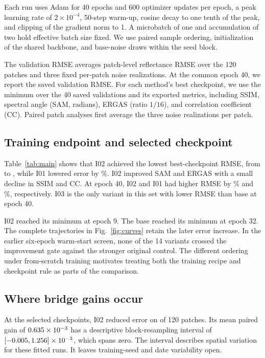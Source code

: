 \documentclass{article}
\begin{document}
Each run uses Adam for 40 epochs and 600 optimizer updates per epoch, a peak learning rate of $2\times10^{-4}$, 50-step warm-up, cosine decay to one tenth of the peak, and clipping of the gradient norm to 1. A microbatch of one and accumulation of two hold effective batch size fixed. We use paired sample ordering, initialization of the shared backbone, and base-noise draws within the seed block.

The validation RMSE averages patch-level reflectance RMSE over the 120 patches and three fixed per-patch noise realizations. At the common epoch 40, we report the saved validation RMSE. For each method's best checkpoint, we use the minimum over the 40 saved validations and its exported metrics, including SSIM, spectral angle (SAM, radians), ERGAS (ratio $1/16$), and correlation coefficient (CC). Paired patch analyses first average the three noise realizations per patch.

\subsection{Training endpoint and selected checkpoint}
Table~\ref{tab:main} shows that I02 achieved the lowest best-checkpoint RMSE, from \BaseBest{} to \BridgeBest{}, while I01 lowered error by \SensorBestGain\%. I02 improved SAM and ERGAS with a small decline in SSIM and CC. At epoch 40, I02 and I01 had higher RMSE by \BridgeEndHarm\% and \SensorEndHarm\%, respectively. I03 is the only variant in this set with lower RMSE than base at epoch 40.

I02 reached its minimum at epoch 9. The base reached its minimum at epoch 32. The complete trajectories in Fig.~\ref{fig:curves} retain the later error increase. In the earlier six-epoch warm-start screen, none of the 14 variants crossed the improvement gate against the stronger original control. The different ordering under from-scratch training motivates treating both the training recipe and checkpoint rule as parts of the comparison.

\subsection{Where bridge gains occur}
At the selected checkpoints, I02 reduced error on \BridgePatchWins{} of 120 patches. Its mean paired gain of $0.635\times10^{-3}$ has a descriptive block-resampling interval of $[-0.005,1.256]\times10^{-3}$, which spans zero. The interval describes spatial variation for these fitted runs. It leaves training-seed and date variability open.
\end{document}
